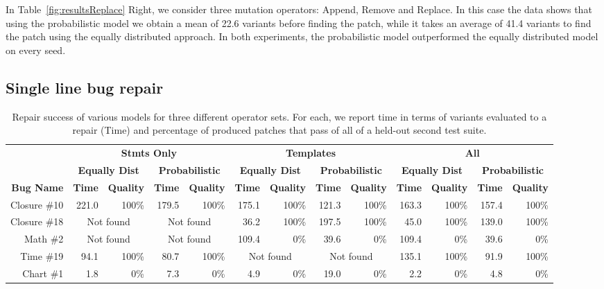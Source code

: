 \documentclass[conference]{IEEEtran}
\begin{document}
In Table~\ref{fig:resultsReplace} Right, we consider three mutation operators: Append, 
Remove and Replace. In this case the data 
shows that using the probabilistic model we obtain a mean of 22.6 variants 
before finding the patch, while it takes an average of 41.4 variants to find the 
patch using the equally distributed approach. In both experiments, the
probabilistic model outperformed the equally distributed model on every seed.

\subsection{Single line bug repair}
\label{sec:single}

\begin{table}\centering
\begin{tabular}{r|rr|rr|rr|rr|rr|rr}
\toprule
  &\multicolumn{4}{c|}{\textbf{Stmts Only}} & \multicolumn{4}{c|}{\textbf{Templates}} & \multicolumn{4}{c}{\textbf{All}} \\  
  & \multicolumn{2}{c|}{\textbf{Equally Dist}} & \multicolumn{2}{c|}{\textbf{Probabilistic}} & \multicolumn{2}{c|}{\textbf{Equally Dist}} & \multicolumn{2}{c|}{\textbf{Probabilistic}} & \multicolumn{2}{c|}{\textbf{Equally Dist}} & 
\multicolumn{2}{c}{\textbf{Probabilistic}} \\

 \textbf{Bug Name} & \textbf{Time} & \textbf{Quality} &  \textbf{Time} & \textbf{Quality} &  \textbf{Time} & \textbf{Quality}&  \textbf{Time} & \textbf{Quality}&  \textbf{Time} & \textbf{Quality}&  \textbf{Time} & \textbf{Quality} \\\midrule

 Closure \#10 & {221.0}& {100\%} & {179.5} &{100\%} & {175.1}&{100\%} & {121.3}&{100\%} & {163.3}&{100\%} & {157.4}&{100\%} \\

 Closure \#18 & \multicolumn{2}{c|}{Not found} & \multicolumn{2}{c|}{Not found} & {36.2}&{100\%} & {197.5}&{100\%} & {45.0}&{100\%} & {139.0}&{100\%} \\

 Math \#2 & \multicolumn{2}{c|}{Not found} & \multicolumn{2}{c|}{Not found} & {109.4}&{0\%} & {39.6}&{0\%} & {109.4}&{0\%} & {39.6}&{0\%} \\

 Time \#19 & {94.1}&{100\%} & {80.7}&{100\%} & \multicolumn{2}{c|}{Not found} & \multicolumn{2}{c|}{Not found} & {135.1}&{100\%} & {91.9}&{100\%} \\

 Chart \#1 & {1.8}&{0\%} & {7.3}&{0\%} & {4.9}&{0\%} & {19.0}&{0\%} & {2.2}&{0\%} & {4.8}&{0\%} \\

\bottomrule

\end{tabular}
		\caption{Repair success of various models for three different operator
          sets.  For each, we report time in terms of variants evaluated to a
          repair (Time) and percentage of produced patches that pass of all of a
          held-out second test suite. \label{tab:singleLineBugs}}
\end{table}
\end{document}
